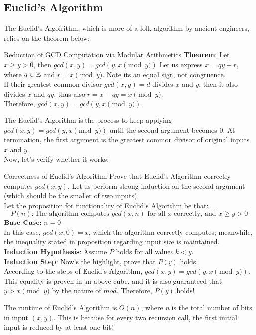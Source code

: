 \subsection{Euclid's Algorithm}
The Euclid's Algoirithm, which is more of a folk algorithm by ancient engineers, relies on the theorem below:
\begin{ln-theorem}{Reduction of GCD Computation via Modular Arithmetics}{}
    \textbf{Theorem}: Let $x \geq y > 0$, then $gcd(x, y) = gcd(y, x\pmod{y})$
    \tcblower
    Let us express $x = qy + r$, where $q \in \mathbb{Z}$ and $r = x\pmod{y}$. Note its an equal sign, not congruence. \\
    If their greatest common divisor $gcd(x, y) = d$ divides $x$ and $y$, then it also divides $x$ and $qy$, thus also $r = x - qy = x\pmod{y}$. \\
    Therefore, $gcd(x, y) = gcd(y, x\pmod{y})$.
\end{ln-theorem}
The Euclid's Algorithm is the process to keep applying $gcd(x, y) = gcd(y, x\pmod{y})$ until the second argument becomes $0$. At termination, the first argument is the greatest common divisor of original inputs $x$ and $y$. \\
Now, let's verify whether it works:
\begin{ln-theorem}{Correctness of Euclid's Algorithm}{}
    Prove that Euclid's Algorithm correctly computes $gcd(x, y)$.
    \tcblower
    Let us perform strong induction on the second argument (which should be the smaller of two inputs). \\
    Let the proposition for functionality of Euclid's Algorithm be that:
    \[P(n) : \text{The algorithm computes $gcd(x, n)$ for all $x$ correctly, and $x \geq y > 0$}\]
    \textbf{Base Case}: $n = 0$ \\
    In this case, $gcd(x, 0) = x$, which the algorithm correctly computes; meanwhile, the inequality stated in proposition regarding input size is maintained. \\
    \textbf{Induction Hypothesis}: Assume $P$ holds for all values $k < y$. \\
    \textbf{Induction Step}: Now's the highlight, prove that $P(y)$ holds. \\
    According to the steps of Euclid's Algorithm, $gcd(x, y) = gcd(y, x\pmod{y})$. This equality is proven in an above cube, and it is also guaranteed that $y > x\pmod{y}$ by the nature of $mod$. Therefore, $P(y)$ holds! 
\end{ln-theorem}
The runtime of Euclid's Algorithm is $O(n)$, where $n$ is the total number of bits in input $(x, y)$. This is because for every two recursion call, the first initial input is reduced by at least one bit!

